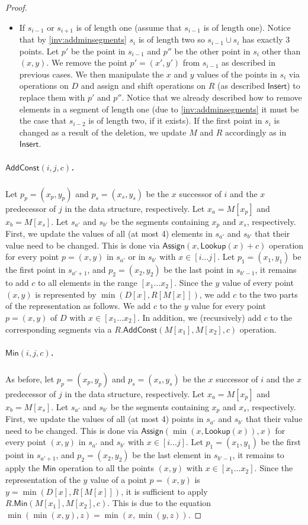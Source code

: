 \documentclass[a4paper,UKenglish,cleveref, autoref, thm-restate]{lipics-v2021}
\newcommand{\AssignOp}{\mathsf{Assign}}
\newcommand{\Insert}{\mathsf{Insert}}
\newcommand{\Lookup}{\mathsf{Lookup}}
\newcommand{\Add}{\mathsf{AddConst}}
\newcommand{\Min}{\mathsf{Min}}
\newcommand{\para}[1]{\vspace{-0.1in} \subparagraph*{#1}}
\begin{document}
\begin{proof}
\begin{itemize}
    \item If $s_{i-1}$ or $s_{i+1}$ is of length one (assume that $s_{i-1}$ is of length one).
        Notice that by \cref{inv:addminsegments} $s_{i}$ is of length two so $s_{i-1}\cup s_{i}$ has exactly $3$ points.
        Let $p'$ be the point in $s_{i-1}$ and $p''$ be the other point in $s_{i}$ other than $(x,y)$.
        We remove the point $p'=(x',y')$ from $s_{i-1}$ as described in previous cases.
        We then manipulate the $x$ and $y$ values of the points in $s_i$ via operations on $D$ and assign and shift operations on $R$ (as described  $\Insert$) to replace them with $p'$ and $p''$.
        Notice that we already described how to remove elements in a segment of length one (due to \cref{inv:addminsegments} it must be the case that $s_{i-2}$ is of length two, if it exists).
        If the first point in $s_{i}$ is changed as a result of the deletion, we update $M$ and $R$ accordingly as in $\Insert$.
\end{itemize}

\para{$\Add(i,j,c)$.}
Let $p_p = (x_p,y_p)$ and $p_s = (x_s,y_s)$ be the $x$ successor of $i$ and the $x$ predecessor of $j$ in the data structure, respectively.
Let $x_a= M[x_p]$ and $x_b=M[x_s]$. Let $s_{a'}$ and $s_{b'}$ be the segments containing $x_p$ and $x_s$, respectively.
First, we update the values of all (at most 4) elements in $s_{a'}$ and $s_{b'}$ that their value need to be changed. 
This is done via $\AssignOp(x, \Lookup(x)+c)$ operation for every point $p=(x,y)$ in $s_{a'}$ or in $s_{b'}$ with $x\in [i\ldots j]$.
Let $p_1 = (x_1,y_1)$ be the first point in $s_{a'+1}$, and $p_2= (x_2,y_2)$ be the last point in $s_{b'-1}$, it remains to add $c$ to all elements in the range $[x_1\ldots x_2]$.
Since the $y$ value of every point $(x,y)$ is represented by $\min(D[x],R[M[x]])$, we add $c$ to the two parts of the representation as follows.
We add $c$ to the $y$ value for every point $p=(x,y)$ of $D$ with $x \in [x_1 \ldots x_2]$.
In addition, we (recursively) add $c$ to the corresponding segments via a $R.\Add(M[x_1],M[x_2],c)$ operation.

\para{$\Min(i,j,c)$.}
As before, let $p_p = (x_p,y_p)$ and $p_s = (x_s,y_s)$ be the $x$ successor of $i$ and the $x$ predecessor of $j$ in the data structure, respectively.
Let $x_a= M[x_p]$ and $x_b=M[x_s]$. Let $s_{a'}$ and $s_{b'}$ be the segments containing $x_p$ and $x_s$, respectively.
First, we update the values of all (at most 4) points in $s_{a'}$ and $s_{b'}$ that their value need to be changed. 
This is done via $\AssignOp(\min(x,\Lookup(x)),x)$ for every point $(x,y)$ in $s_{a'}$ and $s_{b'}$ with $x\in[i\ldots j]$.
Let $p_1=(x_1,y_1)$ be the first point in $s_{a'+1}$, and $p_2 = (x_2,y_2)$ be the last element in $s_{b'-1}$, it remains to apply the $\Min$ operation to all the points $(x,y)$ with $x \in [x_1\ldots x_2]$.
Since the representation of the $y$ value of a point $p=(x,y)$ is $y = \min(D[x],R[M[x]])$, it is sufficient to apply $R.\Min(M[x_1],M[x_2],c)$.
This is due to the equation $\min(\min(x,y),z)=\min(x,\min(y,z))$.


\end{proof}
\end{document}
